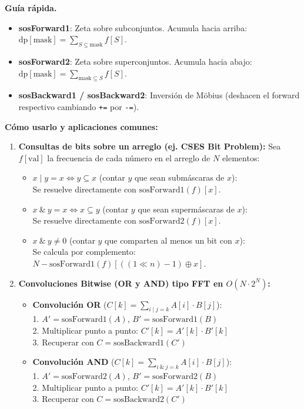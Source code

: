 \smallskip
\noindent\textbf{Gu\'ia r\'apida.}
\begin{itemize}
  \item \textbf{sosForward1}: Zeta sobre subconjuntos. Acumula hacia arriba: $\text{dp}[\text{mask}] = \sum_{S \subseteq \text{mask}} f[S]$.
  \item \textbf{sosForward2}: Zeta sobre superconjuntos. Acumula hacia abajo: $\text{dp}[\text{mask}] = \sum_{\text{mask} \subseteq S} f[S]$.
  \item \textbf{sosBackward1 / sosBackward2}: Inversi\'on de M\"obius (deshacen el forward respectivo cambiando \texttt{+=} por \texttt{-=}).
\end{itemize}

\smallskip
\noindent\textbf{C\'omo usarlo y aplicaciones comunes:}
\begin{enumerate}
  \item \textbf{Consultas de bits sobre un arreglo (ej. CSES Bit Problem):}
  Sea $f[\text{val}]$ la frecuencia de cada n\'umero en el arreglo de $N$ elementos:
  \begin{itemize}
    \item $x \mid y = x \iff y \subseteq x$ (contar $y$ que sean subm\'ascaras de $x$):\\
    Se resuelve directamente con $\text{sosForward1}(f)[x]$.
    \item $x \ \& \ y = x \iff x \subseteq y$ (contar $y$ que sean superm\'ascaras de $x$):\\
    Se resuelve directamente con $\text{sosForward2}(f)[x]$.
    \item $x \ \& \ y \neq 0$ (contar $y$ que comparten al menos un bit con $x$):\\
    Se calcula por complemento: $N - \text{sosForward1}(f)[((1 \ll n) - 1) \oplus x]$.
  \end{itemize}

  \item \textbf{Convoluciones Bitwise (OR y AND) tipo FFT en $O(N \cdot 2^N)$:}
  \begin{itemize}
    \item \textbf{Convoluci\'on OR} ($C[k] = \sum_{i \mid j = k} A[i] \cdot B[j]$):\\
    1. $A' = \text{sosForward1}(A)$, $B' = \text{sosForward1}(B)$\\
    2. Multiplicar punto a punto: $C'[k] = A'[k] \cdot B'[k]$\\
    3. Recuperar con $C = \text{sosBackward1}(C')$
    \item \textbf{Convoluci\'on AND} ($C[k] = \sum_{i \ \& \ j = k} A[i] \cdot B[j]$):\\
    1. $A' = \text{sosForward2}(A)$, $B' = \text{sosForward2}(B)$\\
    2. Multiplicar punto a punto: $C'[k] = A'[k] \cdot B'[k]$\\
    3. Recuperar con $C = \text{sosBackward2}(C')$
  \end{itemize}


\end{enumerate}
